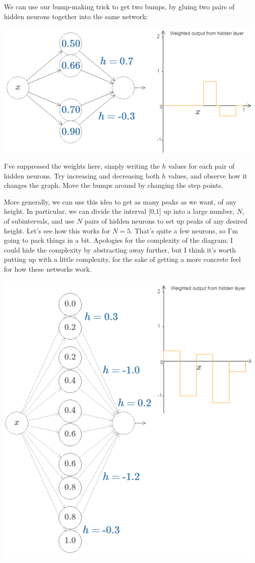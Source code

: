 We can use our bump-making trick to get two bumps, by gluing two pairs of hidden neurons together into the same network:

{\centering \includegraphics[width=\textwidth,]{pic/wigglyfn15.png} \par}

I've suppressed the weights here, simply writing the $h$ values for each pair of hidden neurons. Try increasing and decreasing both $h$ values, and observe how it changes the graph. Move the bumps around by changing the step points.

More generally, we can use this idea to get as many peaks as we want, of any height. In particular, we can divide the interval [0,1]
up into a large number, $N$, of subintervals, and use $N$ pairs of hidden neurons to set up peaks of any desired height. Let's see how this works for $N=5$. That's quite a few neurons, so I'm going to pack things in a bit. Apologies for the complexity of the diagram: I could hide the complexity by abstracting away further, but I think it's worth putting up with a little complexity, for the sake of getting a more concrete feel for how these networks work.


{\centering \includegraphics[width=\textwidth,]{pic/wigglyfn16.png} \par}

